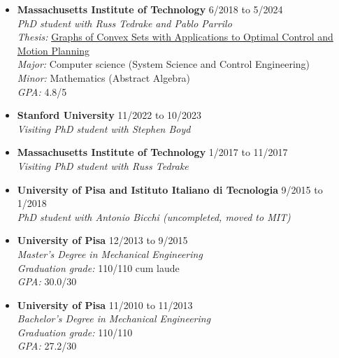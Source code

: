 \documentclass[11pt,a4paper,sans]{moderncv}
\begin{document}
\begin{itemize}


\item \textbf{Massachusetts Institute of Technology} \hfill 6/2018 to 5/2024 \\
\textit{PhD student with Russ Tedrake and Pablo Parrilo} \\
\textit{Thesis:} \href{http://groups.csail.mit.edu/robotics-center/public_papers/Marcucci24a.pdf}{\color{cyan}Graphs of Convex Sets with Applications to Optimal Control and Motion Planning} \\
\textit{Major:} Computer science (System Science and Control Engineering) \\
\textit{Minor:} Mathematics (Abstract Algebra) \\
\textit{GPA:} 4.8/5

\item \textbf{Stanford University} \hfill 11/2022 to 10/2023 \\
\textit{Visiting PhD student with Stephen Boyd}

\item \textbf{Massachusetts Institute of Technology} \hfill 1/2017 to 11/2017 \\
\textit{Visiting PhD student with Russ Tedrake}

\item \textbf{University of Pisa and Istituto Italiano di Tecnologia} \hfill 9/2015 to 1/2018 \\
\textit{PhD student with Antonio Bicchi (uncompleted, moved to MIT)}

\item \textbf{University of Pisa} \hfill 12/2013 to 9/2015 \\
\textit{Master's Degree in Mechanical Engineering} \\
\textit{Graduation grade:} 110/110 cum laude \\
\textit{GPA:} 30.0/30

\item \textbf{University of Pisa} \hfill 11/2010 to 11/2013 \\
\textit{Bachelor's Degree in Mechanical Engineering} \\
\textit{Graduation grade:} 110/110 \\
\textit{GPA:} 27.2/30

\end{itemize}
\end{document}

